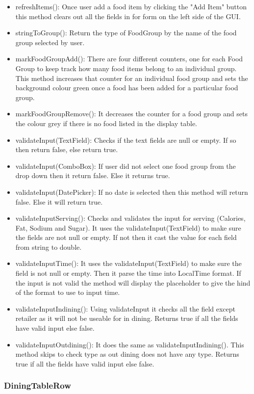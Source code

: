 \documentclass{scrreprt}
\begin{document}
\begin{itemize}
	\item refreshItems(): Once user add a food item by clicking the "Add Item" button this method clears out all the fields in for form on the left side of the GUI.
	\item stringToGroup(): Return the type of FoodGroup by the name of the food group selected by user.
	\item markFoodGroupAdd(): There are four different counters, one for each Food Group to keep track how many food items belong to an individual group. This method increases that counter for an individual food group and sets the background colour green 				once a food has been added for a particular food group.
	\item markFoodGroupRemove(): It decreases the counter for a food group and sets the colour grey if there is no food listed in the display table.
	\item validateInput(TextField): Checks if the text fields are null or empty. If so then return false, else return true.
	\item validateInput(ComboBox): If user did not select one food group from the drop down then it return false. Else it returns true.
	\item validateInput(DatePicker): If no date is selected then this method will return false. Else it will return true.
	\item validateInputServing(): Checks and validates the input for serving (Calories, Fat, Sodium and Sugar). It uses the validateInput(TextField) to make sure the fields are not null or empty. If not then it cast the value for each field from string to double.
	\item validateInputTime(): It uses the validateInput(TextField) to make sure the field is not null or empty. Then it parse the time into LocalTime format. If the input is not valid the method will display the placeholder to give the hind of the format to use to input time.
	\item validateInputIndining(): Using validateInput it checks all the field except retailer as it will not be useable for in dining. Returns true if all the fields have valid input else false.
	\item validateInputOutdining(): It does the same as validateInputIndining(). This method skips to check type as out dining does not have any type. Returns true if all the fields have valid input else false.
\end{itemize}

\subsubsection{DiningTableRow}
\end{document}
